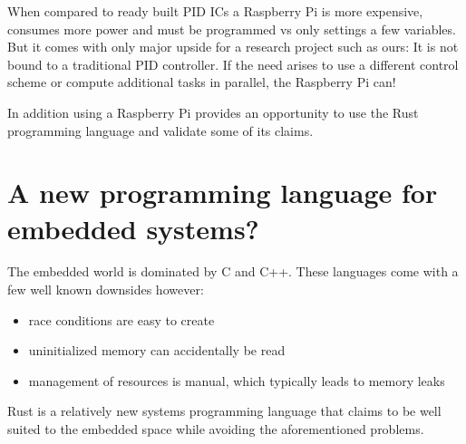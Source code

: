 When compared to ready built PID ICs a Raspberry Pi is more expensive, consumes more power and must be programmed vs only settings a few variables.
But it comes with only major upside for a research project such as ours:
It is not bound to a traditional PID controller. If the need arises to use a different control scheme or compute additional tasks in parallel, the Raspberry Pi can!

In addition using a Raspberry Pi provides an opportunity to use the Rust programming language and validate some of its claims.

\section{A new programming language for embedded systems?}
The embedded world is dominated by C and C++.
These languages come with a few well known downsides however:
\begin{itemize}
    \item race conditions are easy to create
    \item uninitialized memory can accidentally be read
    \item management of resources is manual, which typically leads to memory leaks 
\end{itemize}

Rust is a relatively new systems programming language that claims to be well suited to the embedded space while avoiding the aforementioned problems.
